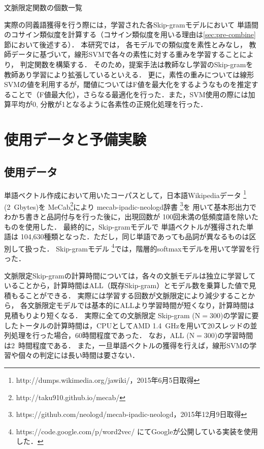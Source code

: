 \documentclass[japanese]{jnlp_1.4}
\begin{document}
\begin{table}[b]
\caption{文脈限定関数の個数一覧}
\label{tb:context_size}

\end{table}

実際の同義語獲得を行う際には，学習された各Skip-gramモデルにおいて
単語間のコサイン類似度を計算する（コサイン類似度を用いる理由は\ref{sec:pre-combine}節において後述する）．
本研究では，
各モデルでの類似度を素性とみなし，
教師データに基づいて，線形SVMで各々の素性に対する重みを学習することにより，
判定関数を構築する．
そのため，提案手法は教師なし学習のSkip-gramを教師あり学習により拡張しているといえる．
更に，素性の重みについては線形SVMの値を利用するが，閾値についてはF値を最大化をするようなものを推定することで（F値最大化），さらなる最適化を行った．また，SVM使用の際には加算平均が0, 分散が1となるように各素性の正規化処理を行った．


\section{使用データと予備実験}
\label{sec: data-and-preexperiment}

\subsection{使用データ}
\label{subsec:ex:data}

単語ベクトル作成において用いたコーパスとして，日本語Wikipediaデータ
\footnote{http://dumps.wikimedia.org/jawiki/，2015年6月5日取得} (2~Gbytes)を
MeCab\footnote{http://taku910.github.io/mecab/}により
mecab-ipadic-neologd辞書
\footnote{https://github.com/neologd/mecab-ipadic-neologd，2015年12月9日取得}を
用いて基本形出力でわかち書きと品詞付与を行った後に，出現回数が
100回未満の低頻度語を除いたものを使用した．
最終的に，Skip-gramモデルで
単語ベクトルが獲得された単語は
104,630種類となった．ただし，同じ単語であっても品詞が異なるものは区別して扱った．
Skip-gramモデル
\footnote{https://code.google.com/p/word2vec/ にてGoogleが公開している実装を使用した．}では，階層的softmaxモデルを用いて学習を行った．

文脈限定Skip-gramの計算時間については，各々の文脈モデルは独立に学習していることから，計算時間はALL（既存Skip-gram）とモデル数を乗算した値で見積もることができる．
実際には学習する回数が文脈限定により減少することから，
各文脈限定モデルでは基本的にALLより学習時間が短くなり，計算時間は見積もりより短くなる．
実際に全ての文脈限定 Skip-gram ($\mathrm{N}=300$)の学習に要したトータルの計算時間は，CPUとしてAMD 1.4~GHzを用いて20スレッドの並列処理を行った場合，60時間程度であった．
なお，ALL ($\mathrm{N}=300$)の学習時間は2~時間程度である．
また，一旦単語ベクトルの獲得を行えば，線形SVMの学習や個々の判定には長い時間は要さない．
\end{document}
